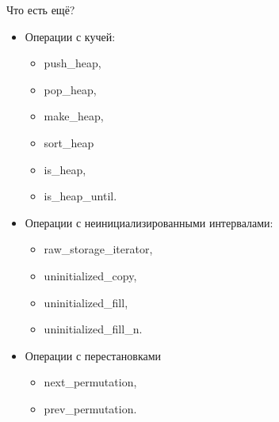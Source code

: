 \documentclass[aspectration=1610,t]{beamer}
\begin{document}
\begin{frame}[fragile]{Что есть ещё?}
\begin{itemize}
    \item Операции с кучей:
        \begin{itemize}
            \tt 
            \item push\_heap, 
            \item pop\_heap, 
            \item make\_heap, 
            \item sort\_heap
            \item is\_heap,
            \item is\_heap\_until.
            
        \end{itemize}
    \item Операции с неинициализированными интервалами:
        \begin{itemize}
            \tt
            \item raw\_storage\_iterator,
            \item uninitialized\_copy,
            \item uninitialized\_fill,
            \item uninitialized\_fill\_n.
        \end{itemize}
    \item Операции с перестановками
        \begin{itemize}
            \tt 
            \item next\_permutation,
            \item prev\_permutation.
        \end{itemize}
\end{itemize}
\end{frame}
\end{document}
